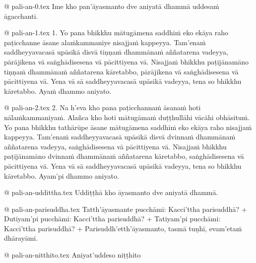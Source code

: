 @ pali-an-0.tex
Ime kho pan’āyasmanto dve aniyatā dhammā uddesaṁ āgacchanti.

@ pali-an-1.tex
1. Yo pana bhikkhu mātugāmena saddhiṁ eko ekāya raho paṭicchanne āsane alaṁkammaniye nisajjaṁ kappeyya. Tam’enaṁ saddheyyavacasā upāsikā disvā tiṇṇaṁ dhammānaṁ aññatarena vadeyya, pārājikena vā saṅghādisesena vā pācittiyena vā. Nisajjaṁ bhikkhu paṭijānamāno tiṇṇaṁ dhammānaṁ aññatarena kāretabbo, pārājikena vā saṅghādisesena vā pācittiyena vā. Yena vā sā saddheyyavacasā upāsikā vadeyya, tena so bhikkhu kāretabbo. Ayaṁ dhammo aniyato.

@ pali-an-2.tex
2. Na h’eva kho pana paṭicchannaṁ āsanaṁ hoti nālaṁkammaniyaṁ. Alañca kho hoti mātugāmaṁ duṭṭhullāhi vācāhi obhāsituṁ. Yo pana bhikkhu tathārūpe āsane mātugāmena saddhiṁ eko ekāya raho nisajjaṁ kappeyya. Tam’enaṁ saddheyyavacasā upāsikā disvā dvinnaṁ dhammānaṁ aññatarena vadeyya, saṅghādisesena vā pācittiyena vā. Nisajjaṁ bhikkhu paṭijānamāno dvinnaṁ dhammānaṁ aññatarena kāretabbo, saṅghādisesena vā pācittiyena vā. Yena vā sā saddheyyavacasā upāsikā vadeyya, tena so bhikkhu kāretabbo. Ayam’pi dhammo aniyato.

@ pali-an-uddittha.tex
Uddiṭṭhā kho āyasmanto dve aniyatā dhammā.

@ pali-an-parisuddha.tex
Tatth’āyasmante pucchāmi: Kacci’ttha parisuddhā? +
Dutiyam’pi pucchāmi: Kacci’ttha parisuddhā? +
Tatiyam’pi pucchāmi: Kacci’ttha parisuddhā? +
Parisuddh’etth’āyasmanto, tasmā tuṇhī, evam’etaṁ dhārayāmi.

@ pali-an-nitthito.tex
Aniyat’uddeso niṭṭhito
